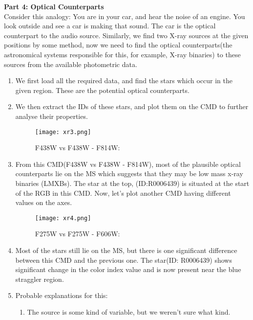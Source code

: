 \documentclass{article}
\begin{document}
\textbf{\Large Part 4: Optical Counterparts}\newline\\
Consider this analogy: You are in your car, and hear the noise of an engine. You look outside and see a car is making that sound. The car is the optical counterpart to the audio source.\newline
Similarly, we find two X-ray sources at the given positions by some method, now we need to find the optical counterparts(the astronomical systems responsible for this, for example, X-ray binaries) to these sources from the available photometric data.
\begin{enumerate}
    \item We first load all the required data, and find the stars which occur in the given region. These are the potential optical counterparts.
    \item We then extract the IDs of these stars, and plot them on the CMD to further analyse their properties.
    \begin{figure}[H]
    \caption{F438W vs F438W - F814W:}
    \centering
    \texttt{[image: xr3.png]}
    \end{figure}\newline
    \item From this CMD(F438W vs F438W - F814W), most of the plausible optical counterparts lie on the MS which suggests that they may be low mass x-ray binaries (LMXBs).\newline
    The star at the top, (ID:R0006439) is situated at the start of the RGB in this CMD. Now, let's plot another CMD having different values on the axes.
    \begin{figure}[H]
    \caption{F275W vs F275W - F606W:}
    \centering
    \texttt{[image: xr4.png]}
    \end{figure}\newline
    \item Most of the stars still lie on the MS, but there is one significant difference between this CMD and the previous one.\newline
    The star(ID: R0006439) shows significant change in the color index value and is now present near the blue straggler region.\newline
    \item Probable explanations for this:\newline
    \begin{enumerate}
        \item The source is some kind of variable, but we weren't sure what kind.

\end{enumerate}
\end{enumerate}
\end{document}
